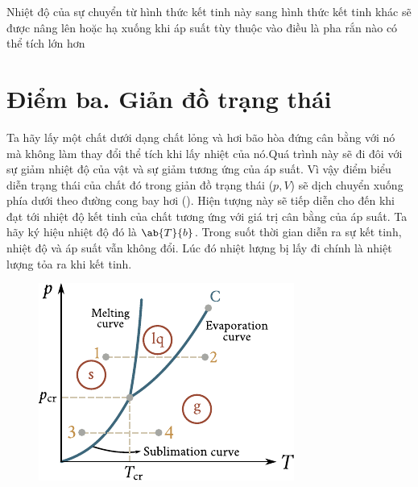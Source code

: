 Nhiệt độ của sự chuyển từ hình thức kết tinh này sang hình thức kết tinh khác sẽ được nâng lên hoặc hạ xuống khi áp suất tùy thuộc vào điều là pha rắn nào có thể tích lớn hơn

\section{Điểm ba. Giản đồ trạng thái}\label{sec:15_8}

Ta hãy lấy một chất dưới dạng chất lỏng và hơi bão hòa đứng cân bằng với nó mà không làm thay đổi thể tích khi lấy nhiệt của nó.Quá trình này sẽ đi đôi với sự giảm nhiệt độ của vật và sự giảm tương ứng của áp suất. Vì vậy điểm biểu diễn trạng thái của chất đó trong giản đồ trạng thái ($p,V$) sẽ dịch chuyển xuống phía dưới theo đường cong bay hơi (). Hiện tượng này sẽ tiếp diễn cho đến khi đạt tới nhiệt độ kết tinh của chất tương ứng với giá trị cân bằng của áp suất. Ta hãy ký hiệu nhiệt độ đó là $\ab{T}{b}$. Trong suốt thời gian diễn ra sự kết tinh, nhiệt độ và áp suất vẫn không đổi. Lúc đó nhiệt lượng bị lấy đi chính là nhiệt lượng tỏa ra khi kết tinh.\\

\begin{figure}[!htb]
	\begin{center}
		\includegraphics[scale=1]{figures/ch_15/fig_15_16.pdf}
		\caption[]{}
		\label{fig:15_16}
	\end{center}
\end{figure}

